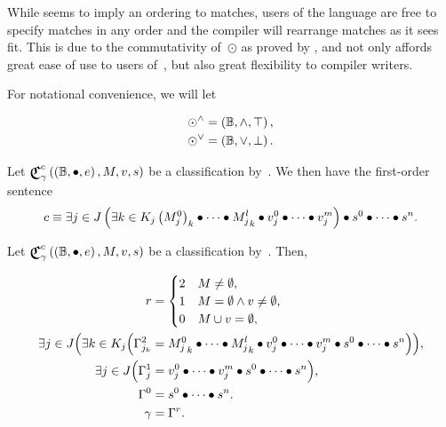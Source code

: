 While  seems to imply an ordering to matches,
  users of the language are free to specify matches in any order
    and the compiler will rearrange matches as it sees fit.
This is due to the commutativity of~$\odot$ as proved by
  ,
    and not only affords great ease of use to users of~\tame{},
      but also great flexibility to compiler writers.

For notational convenience,
  we will let

\begin{equation}
\begin{aligned}
  \odot^\land &= \left({\mathbb{B}},{\land},{\top}\right), \\
  \odot^\lor &= \left({\mathbb{B}},{\lor},{\bot}\right).
\end{aligned}
\end{equation}


\def\cpredmatseq{{M^0_j}_k \bullet\cdots\bullet {M^l_j}_k}
\def\cpredvecseq{v^0_j\bullet\cdots\bullet v^m_j}
\def\cpredscalarseq{s^0\bullet\cdots\bullet s^n}


\begin{axiom}
  Let $\Classify^c_\gamma\left(\Monoid\Bool\bullet e,M,v,s\right)$ be a
    classification by~.
  We then have the first-order sentence
  \begin{equation*}
    c \equiv
      {} \Exists{j\in J}{\Exists{k\in K_j}\cpredmatseq\bullet\cpredvecseq}
        \bullet\cpredscalarseq.
  \end{equation*}
\end{axiom}


\begin{axiom}
\indexsym{}
  Let $\Classify^c_\gamma\left(\Monoid\Bool\bullet e,M,v,s\right)$ be a
    classification by~.
  Then,

  \begin{subequations}
  \begin{align}
    r &= \begin{cases}
           2 &M\neq\emptyset, \\
           1 &M=\emptyset \land v\neq\emptyset, \\
           0 &M\union v = \emptyset,
         \end{cases} \\
    \exists{j\in J}\Big(\exists{k\in K_j}\Big(
      \Gamma^2_{j_k} &= \cpredmatseq\bullet\cpredvecseq\bullet\cpredscalarseq
    \Big)\Big), \\
    \exists{j\in J}\Big(
      \Gamma^1_j &= \cpredvecseq\bullet\cpredscalarseq
    \Big), \\
    \Gamma^0 &= \cpredscalarseq. \\
    \gamma &= \Gamma^r.
  \end{align}
  \end{subequations}
\end{axiom}

